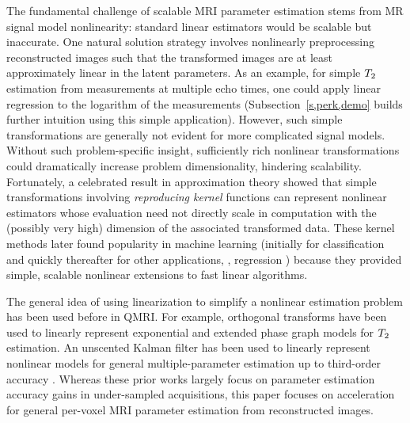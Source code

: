 The fundamental challenge 
of scalable MRI parameter estimation
stems from MR signal model nonlinearity:
standard linear estimators
would be scalable but inaccurate.
One natural solution strategy
involves nonlinearly preprocessing reconstructed images
such that the transformed images 
are at least approximately linear
in the latent parameters.
As an example,
for simple $T_2$ estimation
from measurements at multiple echo times,
one could apply linear regression
to the logarithm of the measurements
(Subsection~\ref{s,perk,demo} builds further intuition
using this simple application).
However,
such simple transformations
are generally not evident 
for more complicated signal models.
Without such problem-specific insight,
sufficiently rich nonlinear transformations
could dramatically increase problem dimensionality,
hindering scalability.
Fortunately, 
a celebrated result
in approximation theory \cite{kimeldorf:70:acb} showed
that simple transformations involving
\emph{reproducing kernel} functions \cite{aronszajn:50:tor}
can represent nonlinear estimators
whose evaluation need not directly scale in computation
with the (possibly very high) dimension
of the associated transformed data.
These kernel methods later found popularity
in machine learning
(initially for classification \cite{cortes:95:svn}
and quickly thereafter for other applications,
\eg, regression \cite{saunders:98:rrl})
because they provided simple, scalable nonlinear extensions
to fast linear algorithms.

The general idea
of using linearization
to simplify a nonlinear estimation problem
has been used before in QMRI.
For example,
orthogonal transforms
have been used
to linearly represent 
exponential \cite{huang:12:tmf}
and extended phase graph \cite{huang:13:trw} models
for $T_2$ estimation.
An unscented Kalman filter 
has been used 
to linearly represent nonlinear models
for general multiple-parameter estimation
up to third-order accuracy \cite{zhao:16:daa}.
Whereas these prior works largely focus
on parameter estimation accuracy gains 
in under-sampled acquisitions,
this paper focuses on acceleration 
for general per-voxel MRI parameter estimation
from reconstructed images.

